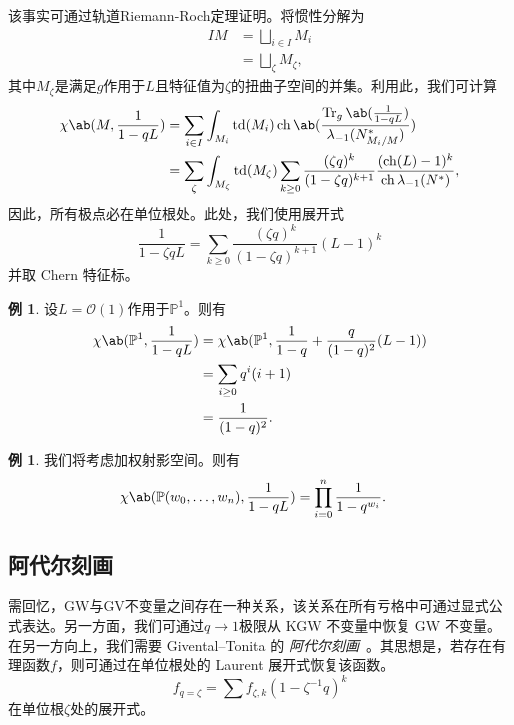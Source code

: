 \documentclass{amsart}
\theoremstyle{definition}
\newtheorem{exm}[thm]{例}
\theoremstyle{remark}
\theoremstyle{plain}
\theoremstyle{definition}
\theoremstyle{remark}
\renewcommand{\P}{\mathbb{P}}
\newcommand{\mc}[1]{\mathcal{#1}}
\newcommand{\on}[1]{\operatorname{#1}}
\newcommand{\1}{\mathbf{1}}
\newcommand{\2}{\mathbf{2}}
\newcommand{\3}{\mathbf{3}}
\DeclareMathOperator{\ch}{ch}
\begin{document}
该事实可通过轨道Riemann-Roch定理证明。将惯性分解为
\begin{align*}
    IM &= \bigsqcup_{i \in I} M_i \\
    &= \bigsqcup_{\zeta} M_{\zeta},
\end{align*}
其中\(M_{\zeta}\)是满足\(g\)作用于\(L\)且特征值为\(\zeta\)的扭曲子空间的并集。利用此，我们可计算
\begin{align*}
    \chi\ab(M, \frac{1}{1-qL}) &= \sum_{i \in I} \int_{M_i} \on{td}(M_i) \on{ch} \ab(\frac{ \on{Tr}_g \ab(\frac{1}{1-qL}) }{\lambda_{-1}(N_{M_i/M}^*)}) \\
    &= \sum_{\zeta} \int_{M_{\zeta}} \on{td}(M_{\zeta}) \sum_{k \geq 0} \frac{(\zeta q)^k}{(1-\zeta q)^{k+1}} \frac{( \on{ch}(L)-1 )^k}{\ch \lambda_{-1}(N^*)},
\end{align*}
因此，所有极点必在单位根处。此处，我们使用展开式
\[ \frac{1}{1-\zeta q L} = \sum_{k \geq 0} \frac{(\zeta q)^k}{(1-\zeta q)^{k+1}} (L-1)^k \]
并取 Chern 特征标。

\begin{exm}
设\(L = \mc{O}(1)\)作用于\(\P^1\)。则有
    \begin{align*}
        \chi\ab(\P^1, \frac{1}{1-qL}) &= \chi\ab(\P^1, \frac{1}{1-q} + \frac{q}{(1-q)^2}(L-1)) \\
        &= \sum_{i \geq 0} q^i (i+1) \\
        &= \frac{1}{(1-q)^2}.
    \end{align*}
\end{exm}

\begin{exm}
我们将考虑加权射影空间。则有
    \begin{align*}
        \chi\ab(\P(w_0, \ldots, w_n), \frac{1}{1-qL}) &= \prod_{i=0}^n \frac{1}{1-q^{w_i}}. 
    \end{align*}
\end{exm}

\subsection{阿代尔刻画}%
\label{sub:Adelic characterization}

需回忆，GW与GV不变量之间存在一种关系，该关系在所有亏格中可通过显式公式表达。另一方面，我们可通过\(q \to 1\)极限从 KGW 不变量中恢复 GW 不变量。在另一方向上，我们需要 Givental--Tonita 的 \textit{阿代尔刻画}~\cite{GiventalTonita2014}。其思想是，若存在有理函数\(f\)，则可通过在单位根处的 Laurent 展开式恢复该函数。
\[ f_{q=\zeta} = \sum f_{\zeta, k} (1-\zeta^{-1} q)^k \]
在单位根\(\zeta\)处的展开式。
\end{document}
